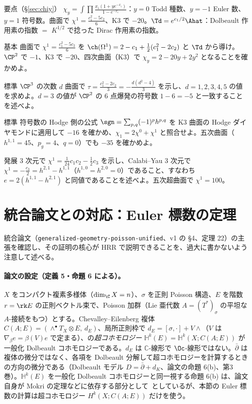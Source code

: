 \begin{keybox}{要点（\S\ref{sec:chiy}）}
$\chi_y=\int\prod\frac{x_i(1+ye^{-x_i})}{1-e^{-x_i}}$：$y=0$ Todd 種数、$y=-1$ Euler 数、$y=1$ 符号数。曲面で $\chi^1=\frac{c_1^2-5c_2}6$、K3 で $-20$。$\Td=e^{c_1/2}\Ahat$：Dolbeault 作用素の指数 $=$ $K^{1/2}$ で捻った Dirac 作用素の指数。
\end{keybox}
\begin{prob}{基本}\label{p:chi1}
曲面で $\chi^1=\frac{c_1^2-5c_2}6$ を $\ch(\Omega^1)=2-c_1+\frac12(c_1^2-2c_2)$ と $\Td$ から導け。$\CP^2$ で $-1$、K3 で $-20$、四次曲面（K3）で $\chi_y=2-20y+2y^2$ となることを確かめよ。
\end{prob}
\begin{prob}{標準}\label{p:sigmaFermat}
$\CP^3$ の次数 $d$ 曲面で $\tau=\frac{c_1^2-2c_2}3=-\frac{d(d^2-4)}3$ を示し、$d=1,2,3,4,5$ の値を求めよ。$d=3$ の値が $\CP^2$ の $6$ 点爆発の符号数 $1-6=-5$ と一致することを述べよ。
\end{prob}
\begin{prob}{標準}\label{p:Hodgesign}
符号数の Hodge 側の公式 $\sgn=\sum_{p,q}(-1)^ph^{p,q}$ を K3 曲面の Hodge ダイヤモンドに適用して $-16$ を確かめ、$\chi_1=2\chi^0+\chi^1$ と照合せよ。五次曲面（$h^{1,1}=45$、$p_g=4$、$q=0$）でも $-35$ を確かめよ。
\end{prob}
\begin{prob}{発展}\label{p:3foldchi}
3 次元で $\chi^1=\frac1{24}c_1c_2-\frac12c_3$ を示し、Calabi--Yau 3 次元で $\chi^1=-\frac{c_3}2=h^{2,1}-h^{1,1}$（$h^{1,0}=h^{2,0}=0$）であること、すなわち $e=2(h^{1,1}-h^{2,1})$ と同値であることを述べよ。五次超曲面で $\chi^1=100$。
\end{prob}

\section{統合論文との対応：Euler 標数の定理}\label{sec:unified}
統合論文（\texttt{generalized-geometry-poisson-unified}、v1 の §4、定理 22）の主張を確認し、その証明の核心が HRR で説明できることを、過大に書かないよう注意して述べる。

\paragraph{論文の設定（定義 5・命題 6 による）。}$X$ をコンパクト複素多様体（$\dim_\C X=n$）、$\sigma$ を正則 Poisson 構造、$E$ を階数 $r=\rk E$ の正則ベクトル束で、Poisson 加群（Lie 亜代数 $A=(T^*)_\sigma$ の平坦な $A$-接続をもつ）とする。Chevalley--Eilenberg 複体 $C(A;E)=(\wedge^\bullet T_X\otimes E,\ d_E)$、局所正則枠で $d_E=[\sigma,\cdot]+V\wedge$（$V$ は $\nabla_\beta e=\beta(V)e$ で定まる）、の\emph{超コホモロジー} $\mathbb H^k(E)=\mathbb H^k(X;C(A;E))$ が一般化 Dolbeault コホモロジーである。$d_E$ は $\mathbb C$-線形で $\Oc$-線形ではない。$\bar\partial$ は複体の微分ではなく、各項を Dolbeault 分解して超コホモロジーを計算するときの方向の微分である（Dolbeault モデル $D=\bar\partial+d_K$、論文の命題 6(b)、第3巻）。$\mathbb H^k(E)$ を一般化 Dolbeault コホモロジーと同一視する命題 6(b) は、論文自身が Mokri の定理などに依存する部分として\tQ\ としているが、本節の Euler 標数の計算は超コホモロジー $H^k(X;C(A;E))$ だけを使う。

